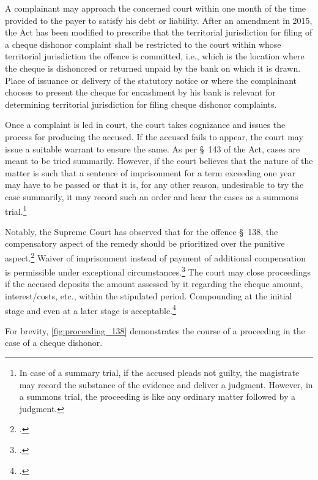 \documentclass[12pt,a4paper]{article}
\begin{document}
\begin{appendices}
		A complainant may approach the concerned court within one month of the time provided to the payer to satisfy his debt or liability. After an amendment in 2015, the Act has been modified to prescribe that the territorial jurisdiction for filing of a cheque dishonor complaint shall be restricted to the court within whose territorial jurisdiction the offence is committed, i.e., which is the location where the cheque is dishonored or returned unpaid by the bank on which it is drawn. Place of issuance or delivery of the statutory notice or where the complainant chooses to present the cheque for encashment by his bank is relevant for determining territorial jurisdiction for filing cheque dishonor complaints.
		
		Once a complaint is led in court, the court takes cognizance and issues the process for producing the accused. If the accused fails to appear, the court may issue a suitable warrant to ensure the same. As per \S~143 of the Act, cases are meant to be tried summarily. However, if the court believes that the nature of the matter is such that a sentence of imprisonment for a term exceeding one year may have to be passed or that it is, for any other reason, undesirable to try the case summarily, it may record such an order and hear the cases as a summons trial.\footnote{In case of a summary trial, if the accused pleads not guilty, the magistrate may record the substance of the evidence and deliver a judgment. However, in a summons trial, the proceeding is like any ordinary matter followed by a judgment.}
		
		Notably, the Supreme Court has observed that for the offence \S~138, the compensatory aspect of the remedy should be prioritized over the punitive aspect.\footcite{sc2010_damodar} Waiver of imprisonment instead of payment of additional compensation is permissible under exceptional circumstances.\footcite{sc2018_priyanka} The court may close proceedings if the accused deposits the amount assessed by it regarding the cheque amount, interest/costs, etc., within the stipulated period. Compounding at the initial stage and even at a later stage is acceptable.\footcite{sc2018_meters} 
		
		For brevity, \cref{fig:proceeding_138} demonstrates the course of a proceeding in the case of a cheque dishonor.
		

\end{appendices}
\end{document}
